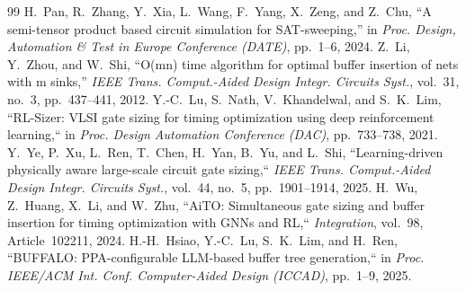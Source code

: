 \documentclass[journal]{IEEEtran}
\begin{document}
\begin{thebibliography}{99}
 H.~Pan, R.~Zhang, Y.~Xia, L.~Wang, F.~Yang, X.~Zeng, and Z.~Chu, ``A semi-tensor product based circuit simulation for SAT-sweeping,'' in \emph{Proc. Design, Automation \& Test in Europe Conference (DATE)}, pp.~1--6, 2024.
 Z.~Li, Y.~Zhou, and W.~Shi, ``O(mn) time algorithm for optimal buffer insertion of nets with m sinks,'' \emph{IEEE Trans. Comput.-Aided Design Integr. Circuits Syst.}, vol.~31, no.~3, pp.~437--441, 2012.
 Y.-C.~Lu, S.~Nath, V.~Khandelwal, and S.~K.~Lim, ``RL-Sizer: VLSI gate sizing for timing optimization using deep reinforcement learning,`` in \emph{Proc. Design Automation Conference (DAC)}, pp.~733--738, 2021.
 Y.~Ye, P.~Xu, L.~Ren, T.~Chen, H.~Yan, B.~Yu, and L.~Shi, ``Learning-driven physically aware large-scale circuit gate sizing,`` \emph{IEEE Trans. Comput.-Aided Design Integr. Circuits Syst.}, vol.~44, no.~5, pp.~1901--1914, 2025.
 H.~Wu, Z.~Huang, X.~Li, and W.~Zhu, ``AiTO: Simultaneous gate sizing and buffer insertion for timing optimization with GNNs and RL,`` \emph{Integration}, vol.~98, Article~102211, 2024.
 H.-H.~Hsiao, Y.-C.~Lu, S.~K.~Lim, and H.~Ren, ``BUFFALO: PPA-configurable LLM-based buffer tree generation,`` in \emph{Proc. IEEE/ACM Int. Conf. Computer-Aided Design (ICCAD)}, pp.~1--9, 2025.
\end{thebibliography}
\end{document}
